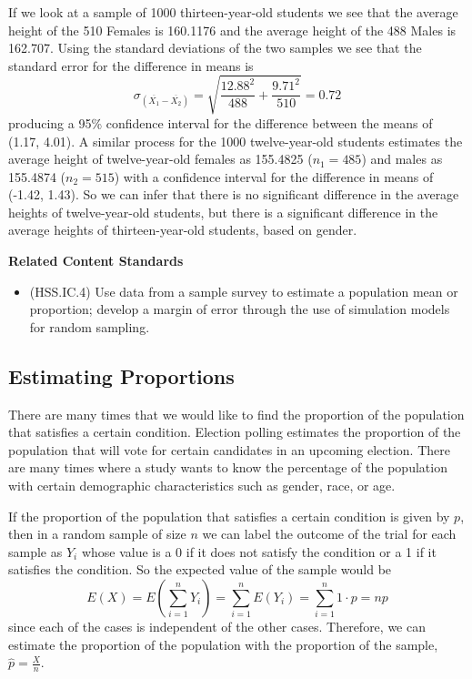 \documentclass[
]{book}
\providecommand{\tightlist}{%
  \setlength{\itemsep}{0pt}\setlength{\parskip}{0pt}}
\newenvironment{standards}{}{}
\theoremstyle{definition}
\theoremstyle{definition}
\theoremstyle{definition}
\theoremstyle{definition}
\theoremstyle{remark}
\begin{document}
If we look at a sample of 1000 thirteen-year-old students we see that the average height of the 510 Females is 160.1176 and the average height of the 488 Males is 162.707. Using the standard deviations of the two samples we see that the standard error for the difference in means is
\[\sigma_{(\overline{X_1}-\overline{X_2})} = \sqrt{\frac{12.88^2}{488} + \frac{9.71^2}{510} } = 0.72\] producing a 95\% confidence interval for the difference between the means of (1.17, 4.01). A similar process for the 1000 twelve-year-old students estimates the average height of twelve-year-old females as 155.4825 (\(n_1=485\)) and males as 155.4874 (\(n_2=515\)) with a confidence interval for the difference in means of (-1.42, 1.43). So we can infer that there is no significant difference in the average heights of twelve-year-old students, but there is a significant difference in the average heights of thirteen-year-old students, based on gender.

\begin{standards}

\begin{center}
\textbf{Related Content Standards}

\end{center}

\begin{itemize}
\tightlist
\item
  (HSS.IC.4) Use data from a sample survey to estimate a population mean or proportion; develop a margin of error through the use of simulation models for random sampling.
\end{itemize}

\end{standards}

\hypertarget{estimating-proportions}{%
\subsection{Estimating Proportions}\label{estimating-proportions}}

There are many times that we would like to find the proportion of the population that satisfies a certain condition. Election polling estimates the proportion of the population that will vote for certain candidates in an upcoming election. There are many times where a study wants to know the percentage of the population with certain demographic characteristics such as gender, race, or age.

If the proportion of the population that satisfies a certain condition is given by \(p\), then in a random sample of size \(n\) we can label the outcome of the trial for each sample as \(Y_i\) whose value is a 0 if it does not satisfy the condition or a 1 if it satisfies the condition. So the expected value of the sample would be \[E(X) = E\left(\sum_{i=1}^n Y_i\right) = \sum_{i=1}^n E(Y_i) = \sum_{i=1}^n 1\cdot p = np\] since each of the cases is independent of the other cases. Therefore, we can estimate the proportion of the population with the proportion of the sample, \(\hat{p} = \frac{X}{n}\).
\end{document}
